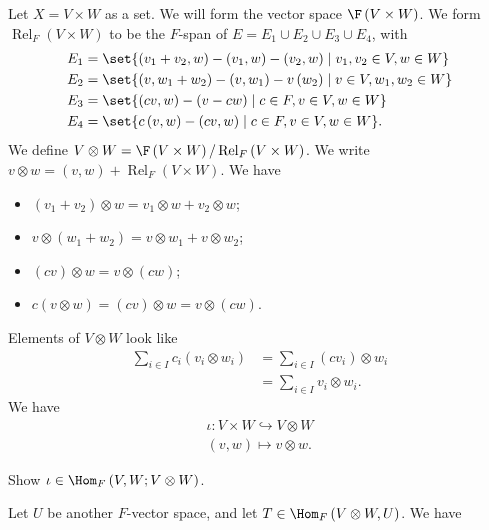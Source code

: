 \documentclass[10pt]{mypackage}
\begin{document}
  Let $X = V\times W$ as a set. We will form the vector space $\F\left(V\times W\right)$. We form $\operatorname{Rel}_{F}\left(V\times W\right)$ to be the $F$-span of $E = E_1 \cup E_2 \cup E_3 \cup E_4$, with
  \begin{align*}
    E_1 &= \set{\left(v_1 + v_2,w\right) - \left(v_1,w\right) - \left(v_2,w\right)\mid v_1,v_2\in V,w\in W}\\
    E_2 &= \set{\left(v,w_1+w_2\right) - \left(v,w_1\right) - v\left(w_2\right)\mid v\in V,w_1,w_2\in W}\\
    E_3 &= \set{\left(cv,w\right) - \left(v-cw\right)\mid c\in F,v\in V,w\in W}\\
    E_4 &= \set{c\left(v,w\right)-\left(cv,w\right)\mid c\in F,v\in V,w\in W}.
  \end{align*}
  We define $V\otimes W = \F\left(V\times W\right)/\operatorname{Rel}_{F}\left(V\times W\right)$. We write $v\otimes w = \left(v,w\right) + \operatorname{Rel}_{F}\left(V\times W\right)$. We have
  \begin{itemize}
    \item $\left(v_1 + v_2\right)\otimes w = v_1\otimes w + v_2\otimes w$;
    \item $v\otimes \left(w_1 + w_2\right) = v\otimes w_1 + v\otimes w_2$;
    \item $\left(cv\right)\otimes w = v\otimes \left(cw\right)$;
    \item $c\left(v\otimes w\right) = \left(cv\right)\otimes w = v\otimes \left(cw\right)$.
  \end{itemize}
  Elements of $V\otimes W$ look like
  \begin{align*}
    \sum_{i\in I}c_i\left(v_i\otimes w_i\right) &= \sum_{i\in I}\left(cv_i\right)\otimes w_i\\
                                                &= \sum_{i\in I}v_i\otimes w_i.
  \end{align*}
  We have
  \begin{align*}
    \iota: V\times W \hookrightarrow V\otimes W\\
    \left(v,w\right) \mapsto v\otimes w.
  \end{align*}
  \begin{exercise}
    Show $\iota\in \Hom_{F}\left(V,W;V\otimes W\right)$.
  \end{exercise}
  Let $U$ be another $F$-vector space, and let $T\in \Hom_{F}\left(V\otimes W,U\right)$. We have
\end{document}

